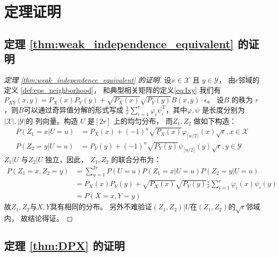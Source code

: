 
\section{定理证明}\label{sec:mmi_proof}

\subsection{定理 \ref{thm:weak_independence_equivalent} 的证明}
\begin{proof}[定理 \ref{thm:weak_independence_equivalent} 的证明]
  设$x\in \mathcal{X}$ 且 $y\in \mathcal{Y}$，
  由$\epsilon$邻域的定义 \ref{def:eps_neighborhood}，
  和典型相关矩阵的定义\eqref{eq:Ixy} 我们有
  $P_{XY}(x,y) = P_X(x)P_Y(y) + \sqrt{P_X(x)}\sqrt{P_Y(y)}B(x,y)
  \cdot\epsilon$。  
  设$B$ 的秩为 $r$，则$B$可以通过奇异值分解的形式写成
  $\frac{1}{r}\sum_{i=1}^r \varphi_i \psi^{\mathrm{T}}_i$，其中$\varphi, \psi$
  是长度分别为$|\mathcal{X}|, |\mathcal{Y}|$的
  列向量。构造 $U$ 是$[2r]$ 上的均匀分布，
  而$Z_1, Z_2$ 做如下构造：
  \begin{align*}
    P(Z_1=x|U=u) &= P_X(x) + (-1)^u\sqrt{P_X(x)}\varphi_{\lceil u/2 \rceil}(x) \sqrt{\epsilon}, x \in \mathcal{X} \\
    P(Z_2=y|U=u) &= P_Y(y) + (-1)^u\sqrt{P_Y(y)}\psi_{\lceil u/2 \rceil}(y) \sqrt{\epsilon}, y \in \mathcal{Y}
  \end{align*}
  $Z_1 | U$ 与$Z_2 | U$ 独立，因此，
  $Z_1, Z_2$ 的联合分布为：
  \begin{align*}
  P(Z_1=x, Z_2=y)& =\sum_{u=1}^{2r}P(U=u)P(Z_1=x|U=u)P(Z_2=y|U=u)\\
  &=P_X(x)P_Y(y) + \sqrt{P_X(x)}\sqrt{P_Y(y)}\frac{\epsilon}{r}
  \sum_{i=1}^{r}\varphi_i(x)
  \psi_i(y) \\
  &=P(X=x,Y=y)
  \end{align*}
  故$Z_1, Z_2$与$X,Y$具有相同的分布。
  另外不难验证$(Z_1, Z_2)|U$在$(Z_1, Z_2)$的$\sqrt{\epsilon}$邻域内，
  故结论得证。
  \end{proof}

\subsection{定理 \ref{thm:DPX} 的证明}

